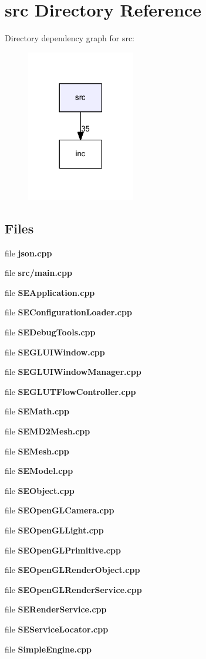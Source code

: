 \section{src Directory Reference}
\label{dir_68267d1309a1af8e8297ef4c3efbcdba}
Directory dependency graph for src\+:
\nopagebreak
\begin{figure}[H]
\begin{center}
\leavevmode
\includegraphics[width=134pt]{dir_68267d1309a1af8e8297ef4c3efbcdba_dep}
\end{center}
\end{figure}
\subsection*{Files}
\begin{DoxyCompactItemize}
\item 
file {\bf json.\+cpp}
\item 
file {\bf src/main.\+cpp}
\item 
file {\bf S\+E\+Application.\+cpp}
\item 
file {\bf S\+E\+Configuration\+Loader.\+cpp}
\item 
file {\bf S\+E\+Debug\+Tools.\+cpp}
\item 
file {\bf S\+E\+G\+L\+U\+I\+Window.\+cpp}
\item 
file {\bf S\+E\+G\+L\+U\+I\+Window\+Manager.\+cpp}
\item 
file {\bf S\+E\+G\+L\+U\+T\+Flow\+Controller.\+cpp}
\item 
file {\bf S\+E\+Math.\+cpp}
\item 
file {\bf S\+E\+M\+D2\+Mesh.\+cpp}
\item 
file {\bf S\+E\+Mesh.\+cpp}
\item 
file {\bf S\+E\+Model.\+cpp}
\item 
file {\bf S\+E\+Object.\+cpp}
\item 
file {\bf S\+E\+Open\+G\+L\+Camera.\+cpp}
\item 
file {\bf S\+E\+Open\+G\+L\+Light.\+cpp}
\item 
file {\bf S\+E\+Open\+G\+L\+Primitive.\+cpp}
\item 
file {\bf S\+E\+Open\+G\+L\+Render\+Object.\+cpp}
\item 
file {\bf S\+E\+Open\+G\+L\+Render\+Service.\+cpp}
\item 
file {\bf S\+E\+Render\+Service.\+cpp}
\item 
file {\bf S\+E\+Service\+Locator.\+cpp}
\item 
file {\bf Simple\+Engine.\+cpp}
\end{DoxyCompactItemize}
